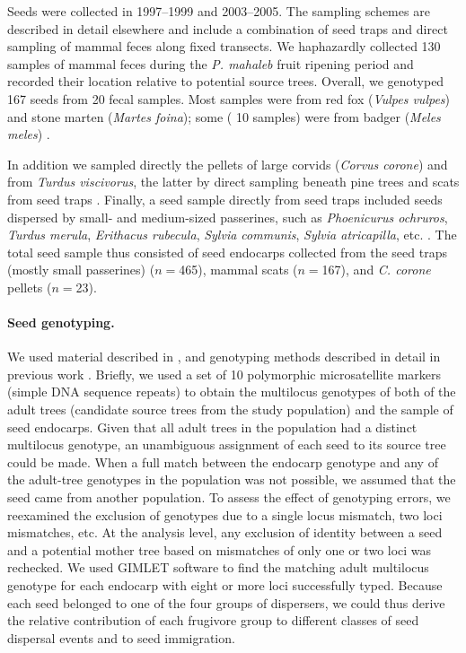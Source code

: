 \documentclass[a4paper, 12pt]{article}
\begin{document}
\begin{linenumbers}
Seeds were collected in 1997–1999 and 2003–2005. The sampling schemes are described in detail elsewhere \citep{Jordano:2007,Garcia:2009do} and include a combination of seed traps and direct sampling of mammal feces along fixed transects. We haphazardly collected 130 samples of mammal feces during the \textit{P. mahaleb} fruit ripening period and recorded their location relative to potential source trees. Overall, we genotyped 167 seeds from 20 fecal samples. Most samples were from red fox (\textit{Vulpes vulpes}) and stone marten (\textit{Martes foina}); some ( 10 samples) were from badger (\textit{Meles meles}) \citep{Jordano:2007}.

In addition we sampled directly the pellets of large corvids (\textit{Corvus corone}) and from \textit{Turdus viscivorus}, the latter by direct sampling beneath pine trees and scats from seed traps \citep[see ][ for details]{Jordano:2007}. Finally, a seed sample directly from seed traps included seeds dispersed by small- and medium-sized passerines, such as \textit{Phoenicurus ochruros}, \textit{Turdus merula}, \textit{Erithacus rubecula}, \textit{Sylvia communis}, \textit{Sylvia atricapilla}, etc. \citep{Jordano:2007}. The total seed sample thus consisted of seed endocarps collected from the seed traps (mostly small passerines) ($n= $465), mammal scats ($n= $167), and \textit{C. corone} pellets ($n= $23). 

\paragraph*{Seed genotyping.} 
We used material described in \citet{Jordano:2007}, and genotyping methods described in detail in previous work \citep{Godoy:2001,Garcia:2007he,Garcia:2009do}. Briefly, we used a set of 10 polymorphic microsatellite markers (simple DNA sequence repeats) \citep{Godoy:2001} to obtain the multilocus genotypes of both of the adult trees (candidate source trees from the study population) and the sample of seed endocarps. Given that all adult trees in the population had a distinct multilocus genotype, an unambiguous assignment of each seed to its source tree could be made. When a full match between the endocarp genotype and any of the adult-tree genotypes in the population was not possible, we assumed that the seed came from another population. To assess the effect of genotyping errors, we reexamined the exclusion of genotypes due to a single locus mismatch, two loci mismatches, etc. At the analysis level, any exclusion of identity between a seed and a potential mother tree based on mismatches of only one or two loci was rechecked. We used GIMLET software \citep{Valiere:2002fo} to find the matching adult multilocus genotype for each endocarp with eight or more loci successfully typed. Because each seed belonged to one of the four groups of dispersers, we could thus derive the relative contribution of each frugivore group to different classes of seed dispersal events and to seed immigration.


\end{linenumbers}
\end{document}

